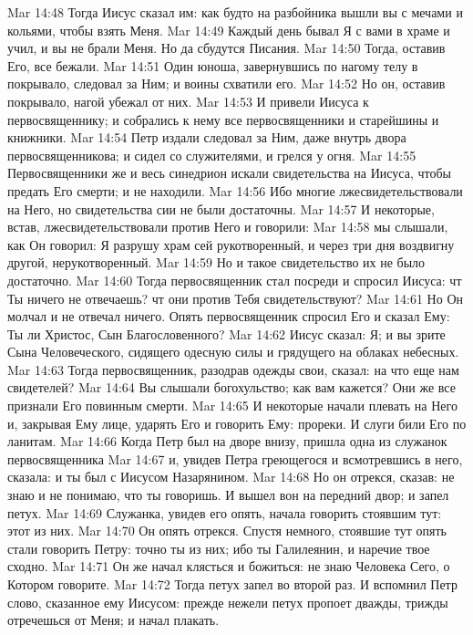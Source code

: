 \vs Mar 14:48 Тогда Иисус сказал им: как будто на разбойника вышли вы с мечами и кольями, чтобы взять Меня.
\vs Mar 14:49 Каждый день бывал Я с вами в храме и учил, и вы не брали Меня. Но да сбудутся Писания.
\vs Mar 14:50 Тогда, оставив Его, все бежали.
\vs Mar 14:51 Один юноша, завернувшись по нагому телу в покрывало, следовал за Ним; и воины схватили его.
\vs Mar 14:52 Но он, оставив покрывало, нагой убежал от них.
\rsbpar\vs Mar 14:53 И привели Иисуса к первосвященнику; и собрались к нему все первосвященники и старейшины и книжники.
\vs Mar 14:54 Петр издали следовал за Ним, даже внутрь двора первосвященникова; и сидел со служителями, и грелся у огня.
\vs Mar 14:55 Первосвященники же и весь синедрион искали свидетельства на Иисуса, чтобы предать Его смерти; и не находили.
\vs Mar 14:56 Ибо многие лжесвидетельствовали на Него, но свидетельства сии не были достаточны.
\vs Mar 14:57 И некоторые, встав, лжесвидетельствовали против Него и говорили:
\vs Mar 14:58 мы слышали, как Он говорил: Я разрушу храм сей рукотворенный, и через три дня воздвигну другой, нерукотворенный.
\vs Mar 14:59 Но и такое свидетельство их не было достаточно.
\vs Mar 14:60 Тогда первосвященник стал посреди и спросил Иисуса: чт Ты ничего не отвечаешь? чт они против Тебя свидетельствуют?
\vs Mar 14:61 Но Он молчал и не отвечал ничего. Опять первосвященник спросил Его и сказал Ему: Ты ли Христос, Сын Благословенного?
\vs Mar 14:62 Иисус сказал: Я; и вы зрите Сына Человеческого, сидящего одесную силы и грядущего на облаках небесных.
\vs Mar 14:63 Тогда первосвященник, разодрав одежды свои, сказал: на что еще нам свидетелей?
\vs Mar 14:64 Вы слышали богохульство; как вам кажется? Они же все признали Его повинным смерти.
\vs Mar 14:65 И некоторые начали плевать на Него и, закрывая Ему лице, ударять Его и говорить Ему: прореки. И слуги били Его по ланитам.
\rsbpar\vs Mar 14:66 Когда Петр был на дворе внизу, пришла одна из служанок первосвященника
\vs Mar 14:67 и, увидев Петра греющегося и всмотревшись в него, сказала: и ты был с Иисусом Назарянином.
\vs Mar 14:68 Но он отрекся, сказав: не знаю и не понимаю, что ты говоришь. И вышел вон на передний двор; и запел петух.
\vs Mar 14:69 Служанка, увидев его опять, начала говорить стоявшим тут: этот из них.
\vs Mar 14:70 Он опять отрекся. Спустя немного, стоявшие тут опять стали говорить Петру: точно ты из них; ибо ты Галилеянин, и наречие твое сходно.
\vs Mar 14:71 Он же начал клясться и божиться: не знаю Человека Сего, о Котором говорите.
\vs Mar 14:72 Тогда петух запел во второй раз. И вспомнил Петр слово, сказанное ему Иисусом: прежде нежели петух пропоет дважды, трижды отречешься от Меня; и начал плакать.
